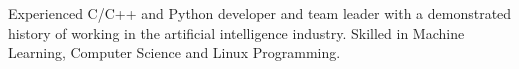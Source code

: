 


\begin{cvparagraph}

Experienced C/C++ and Python developer and team leader with a demonstrated history of working in the artificial intelligence industry. Skilled in Machine Learning, Computer Science and Linux Programming.
\end{cvparagraph}
